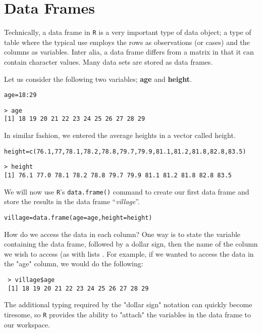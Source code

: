 
\tableofcontents


\section{Data Frames}
Technically, a data frame in \texttt{R} is a very important type of data object;  a type of table where the typical use employs the rows as observations (or cases) and the columns as variables.
Inter alia, a data frame differs from a matrix in that it can contain character values. Many data sets are stored as data frames.

Let us consider the following two variables; \textbf{age} and \textbf{height}.

\begin{framed}
\begin{verbatim}
age=18:29
\end{verbatim}
\end{framed}
\begin{verbatim}
> age
[1] 18 19 20 21 22 23 24 25 26 27 28 29
\end{verbatim}
In similar fashion, we entered the average heights in a vector called height.
\begin{framed}
\begin{verbatim}
height=c(76.1,77,78.1,78.2,78.8,79.7,79.9,81.1,81.2,81.8,82.8,83.5)
\end{verbatim}
\end{framed}
\begin{verbatim}
> height
[1] 76.1 77.0 78.1 78.2 78.8 79.7 79.9 81.1 81.2 81.8 82.8 83.5
\end{verbatim}




We will now use \texttt{R}'s \texttt{data.frame()} command to create our first data frame and store the results in the data frame “\textit{village}”.
\begin{framed}
\begin{verbatim}
village=data.frame(age=age,height=height)
\end{verbatim}
\end{framed}

How do we access the data in each column? One way is to state the variable containing the data frame, followed by a dollar sign, then the name of the column we wish to access (as with lists . For example, if we wanted to access the data in the "age" column, we would do the following:
\begin{verbatim}
 > village$age
 [1] 18 19 20 21 22 23 24 25 26 27 28 29
\end{verbatim}
The additional typing required by the "dollar sign" notation can quickly become tiresome, so \texttt{R} provides the ability to "attach" the variables in the data frame to our workspace.

